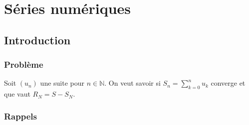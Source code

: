 \documentclass[a4paper,10pt]{book} %
\newcommand{\N}{\mathbb{N}}
\newcommand{\displayAmath}{\displaystyle}
\begin{document}
\chapter{Séries numériques}
\section*{Introduction}
\subsection*{Problème}
Soit $(u_n)$ une suite pour $n\in\N$. On veut savoir si $\displayAmath S_n=\sum_{k=0}^nu_k$ converge et que vaut $R_N=S-S_N$.

\subsection*{Rappels}
\end{document}
